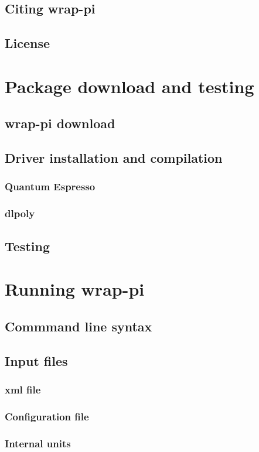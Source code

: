 \documentclass[12pt,fleqn]{report}
\begin{document}
\section{Citing wrap-pi}
\section{License}

\chapter{Package download and testing}
\section{wrap-pi download}
\section{Driver installation and compilation}
\subsection{Quantum Espresso}
\subsection{dlpoly}
\section{Testing}

\chapter{Running wrap-pi}
\section{Commmand line syntax}
\section{Input files}
\subsection{xml file}
\subsection{Configuration file}
\subsection{Internal units}
\end{document}

